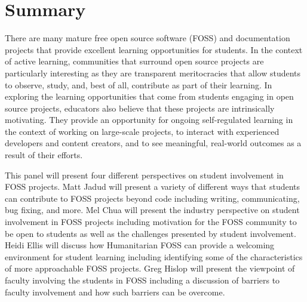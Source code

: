 \documentclass{sig-alternate}
\begin{document}
\begin{comment} 

	\end{comment}
	
                
\maketitle



\section{Summary}
There are many mature free open source software (FOSS) and documentation projects that provide excellent learning opportunities for students.  In the context of active learning, communities that surround open source projects are particularly interesting as they are transparent meritocracies that allow students to observe, study, and, best of all, contribute as part of their learning.  In exploring the learning opportunities that come from students engaging in open source projects, educators also believe that these projects are intrinsically motivating. They provide an opportunity for ongoing self-regulated learning in the context of working on large-scale projects, to interact with experienced developers and content creators, and to see meaningful, real-world outcomes as a result of their efforts.

This panel will present four different perspectives on student involvement in FOSS projects. Matt Jadud will present a variety of different ways that students can contribute to FOSS projects beyond code including writing, communicating, bug fixing, and more. Mel Chua will present the industry perspective on student involvement in FOSS projects including motivation for the FOSS community to be open to students as well as the challenges presented by student involvement. Heidi Ellis will discuss how Humanitarian FOSS can provide a welcoming environment for student learning including identifying some of the characteristics of more approachable FOSS projects. Greg Hislop will present the viewpoint of faculty involving the students in FOSS including a discussion of barriers to faculty involvement and how such barriers can be overcome. 
\end{document}
